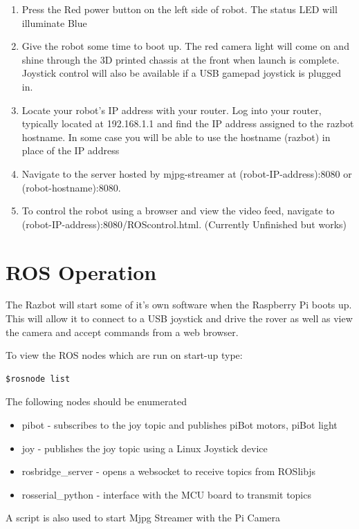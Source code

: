 \documentclass[12pt,titlepage,oneside]{memoir}
\begin{document}
\begin{enumerate}
\item Press the Red power button on the left side of robot. The status LED will illuminate Blue
\item Give the robot some time to boot up. The red camera light will come on and shine through the 3D printed chassis at the front when launch is complete. Joystick control will also be available if a USB gamepad joystick is plugged in.
\item Locate your robot's IP address with your router. Log into your router, typically located at 192.168.1.1 and find the IP address assigned to the razbot hostname. In some case you will be able to use the hostname (razbot) in place of the IP address
\item Navigate to the server hosted by mjpg-streamer at  (robot-IP-address):8080 or (robot-hostname):8080.
\item To control the robot using a browser and view the video feed, navigate to (robot-IP-address):8080/ROScontrol.html. (Currently Unfinished but works)
\end{enumerate}

\section{ROS Operation}

The Razbot will start some of it's own software when the Raspberry Pi boots up. This will allow it to connect to a USB joystick and drive the rover as well as view the camera and accept commands from a web browser.

To view the ROS nodes which are run on start-up type:
\begin{verbatim}
$rosnode list
\end{verbatim}

The following nodes should be enumerated

\begin{itemize}
\item pibot - subscribes to the joy topic and publishes piBot motors, piBot light
\item joy - publishes the joy topic using a Linux Joystick device
\item rosbridge{\_}server - opens a websocket to receive topics from ROSlibjs
\item rosserial{\_}python - interface with the MCU board to transmit topics
\end{itemize}

A script is also used to start Mjpg Streamer with the Pi Camera\\
\end{document}
